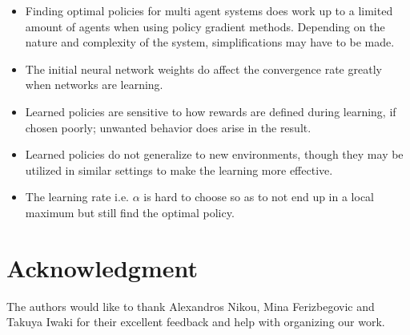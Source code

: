 \documentclass[journal,twoside]{IEEEtran}
\begin{document}
\begin{itemize}
	\item Finding optimal policies for multi agent systems does work up to a limited amount of agents when using policy gradient methods. Depending on the nature and complexity of the system, simplifications may have to be made.
	\item The initial neural network weights do affect the convergence rate greatly when networks are learning. 
	\item Learned policies are sensitive to how rewards are defined during learning, if chosen poorly; unwanted behavior does arise in the result.
	\item Learned policies do not generalize to new environments, though they may be utilized in similar settings to make the learning more effective.
	\item The learning rate i.e. $\alpha$ is hard to choose so as to not end up in a local maximum but still find the optimal policy.
	
\end{itemize}

\section*{Acknowledgment}

The authors would like to thank Alexandros Nikou, Mina Ferizbegovic and Takuya Iwaki for their excellent feedback and help with organizing our work.

\ifCLASSOPTIONcaptionsoff
  \newpage
\fi




\end{document}
